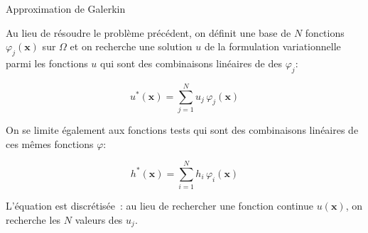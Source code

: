 \documentclass[
mode=present,    %
paper=a4paper,   %
orient=landscape,
display=slides,   %
size=10pt,     %
style=romain   %
]{powerdot}
\begin{document}
\begin{slide}{Approximation de Galerkin}

Au lieu de résoudre le problème précédent, on définit une base de $N$ fonctions $\varphi_j(\boldsymbol{x})$ sur $\Omega$ et on recherche une solution $u$ de la formulation variationnelle parmi les fonctions $u$ qui sont des combinaisons linéaires de des $\varphi_j$:

\begin{equation*}
     u^*(\boldsymbol{x}) = \sum_{j=1}^N u_j \,\varphi_j(\boldsymbol{x})
\end{equation*}

On se limite également aux fonctions tests qui sont des combinaisons linéaires de ces mêmes fonctions $\varphi$:

\begin{equation*}
     h^*(\boldsymbol{x}) = \sum_{i=1}^N h_i \,\varphi_i(\boldsymbol{x})
\end{equation*}

\bigskip

L'équation est discrétisée~: au lieu de rechercher une fonction continue $u(\boldsymbol{x})$, on recherche les $N$ valeurs des $u_j$.

\end{slide}
\end{document}
